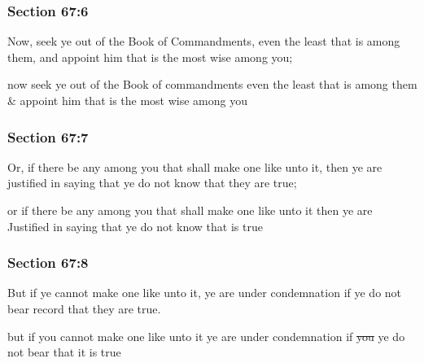 	\subsubsection{Section 67:6} %
		\label{DC67-6}

		Now, seek ye out of the Book of Commandments, even the least that is among them, and appoint him that is the most wise among you;

		\begin{framed}
		\scriptsize
			\begin{compactdesc}
				\item[JSP] now seek ye out of the Book of commandments even the least that is among them \& appoint him that is the most wise among you
			\end{compactdesc}
		\end{framed}

	\subsubsection{Section 67:7} %
		\label{DC67-7}

		Or, if there be any among you that shall make one like unto it, then ye are justified in saying that ye do not know that they are true;

		\begin{framed}
		\scriptsize
			\begin{compactdesc}
				\item[JSP] or if there be any among you that shall make one like unto it then ye are Justified in saying that ye do not know that is true
			\end{compactdesc}
		\end{framed}

	\subsubsection{Section 67:8} %
		\label{DC67-8}

		But if ye cannot make one like unto it, ye are under condemnation if ye do not bear record that they are true.

		\begin{framed}
		\scriptsize
			\begin{compactdesc}
				\item[JSP] but if you cannot make one like unto it ye are under condemnation if \sout{you} ye do not bear that it is true
			\end{compactdesc}
		\end{framed}

